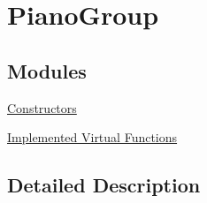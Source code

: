\hypertarget{group___piano_group}{}\section{Piano\+Group}
\label{group___piano_group}
\subsection*{Modules}
\begin{DoxyCompactItemize}
\item 
\hyperlink{group___piano_construct}{Constructors}
\item 
\hyperlink{group___piano_virt}{Implemented Virtual Functions}
\end{DoxyCompactItemize}


\subsection{Detailed Description}
